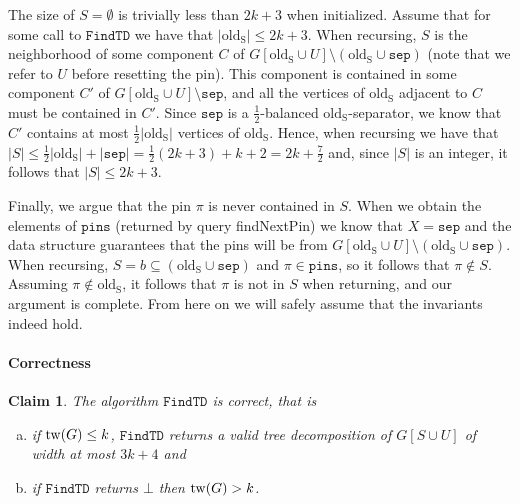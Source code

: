 \documentclass[a4paper,11pt]{article}
\newtheorem{claim}[lemma]{Claim}
\theoremstyle{definition}
\theoremstyle{remark}
\newcommand{\findTD}{\mathtt{FindTD}}
\newcommand{\oldS}{\mathrm{old_S}}
\newcommand{\sep}{\mathtt{sep}}
\newcommand{\pins}{\mathtt{pins}}
\newcommand{\qpin}{\textnormal{findNextPin}}
\newcommand{\false}{\bot}
\newcommand{\pin}{\pi}
\begin{document}
The size of $S = \emptyset$ is trivially less than $2k+3$ when initialized.
Assume that for some call to $\findTD$ we have that $|\oldS| \leq
2k+3$.  When recursing, $S$ is the neighborhood of some component $C$
of $G[\oldS\cup U]\setminus (\oldS\cup \sep)$ (note that we refer to
$U$ before resetting the pin).  This component is contained in some
component $C'$ of $G[\oldS \cup U]\setminus \sep$, and all the
vertices of $\oldS$ adjacent to $C$ must be contained in $C'$.  Since
$\sep$ is a $\frac{1}{2}$-balanced $\oldS$-separator, we know that
$C'$ contains at most $\frac{1}{2}|\oldS|$ vertices of $\oldS$.
Hence, when recursing we have that $|S| \leq \frac{1}{2}|\oldS| +
|\sep| = \frac{1}{2}(2k+3)+k+2 = 2k + \frac{7}{2}$ and, since $|S|$ is
an integer, it follows that $|S| \leq 2k+3$.

Finally, we argue that the pin $\pin$ is never contained in $S$.  When
we obtain the elements of $\pins$ (returned by query \qpin) we know
that $X = \sep$ and the data structure guarantees that the pins will
be from $G[\oldS\cup U] \setminus (\oldS \cup \sep)$.  When recursing,
$S = b \subseteq (\oldS \cup \sep)$ and $\pi \in \pins$, so it follows
that $\pi \notin S$.  Assuming $\pi \notin \oldS$, it follows that
$\pi$ is not in $S$ when returning, and our argument is complete.
From here on we will safely assume that the invariants indeed hold.

\paragraph{Correctness}
\begin{claim}
  \label{claim:findtd-nlogn-correct}
  The algorithm $\findTD$ is correct, that is
  \begin{enumerate}[(a)]
  \item\label{item:1:claim:findtd-nlogn-correct} if $\mathrm{tw}(G) \leq k$,
    $\findTD$ returns a valid tree decomposition of $G[S\cup U]$ of
    width at most $3k+4$ and
  \item\label{item:2:claim:findtd-nlogn-correct} if $\findTD$ returns
    $\false$ then $\mathrm{tw}(G) > k$.
  \end{enumerate}
\end{claim}
\end{document}
